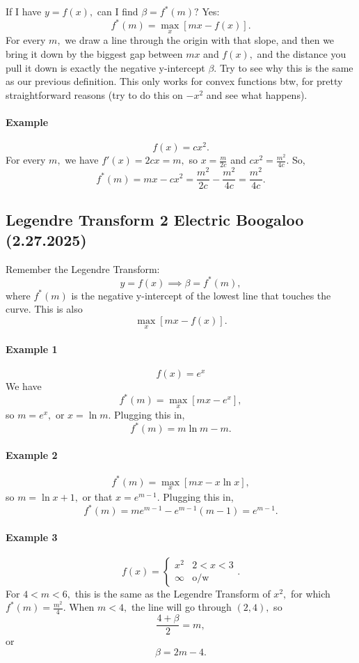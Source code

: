 \documentclass[12pt]{article}
\theoremstyle{remark}
\begin{document}
If I have $y=f(x),$ can I find $\beta=f^\ast(m)?$ Yes:
\[f^\ast(m)=\max_{x}[mx-f(x)].\] For every $m,$ we draw a line through the origin with that slope, and then we bring it down by the biggest gap between $mx$ and $f(x),$ and the distance you pull it down is exactly the negative y-intercept $\beta.$ Try to see why this is the same as our previous definition. This only works for convex functions btw, for pretty straightforward reasons (try to do this on $-x^2$ and see what happens).

\paragraph{Example}
\[f(x)=cx^2.\]
For every $m,$ we have $f'(x)=2cx=m,$ so $x=\frac{m}{2c}$ and $cx^2=\frac{m^2}{4c}.$
So,
\[f^\ast(m)=mx-cx^2=\frac{m^2}{2c}-\frac{m^2}{4c}=\frac{m^2}{4c}.\]

\subsection{Legendre Transform 2 Electric Boogaloo (2.27.2025)}
Remember the Legendre Transform:
\[y=f(x)\implies \beta=f^\ast(m),\]
where $f^\ast(m)$ is the negative y-intercept of the lowest line that touches the curve. This is also
\[\max_x[mx-f(x)].\]
\paragraph{Example 1}
\[f(x)=e^x\]
We have
\[f^\ast(m)=\max_x[mx-e^x],\] so $m=e^x,$ or $x=\ln m.$ Plugging this in,
\[f^\ast(m)=m\ln m-m.\]

\paragraph{Example 2}
\[f^\ast(m)=\max_x[mx-x\ln x],\] so $m=\ln x + 1,$ or that $x=e^{m-1}.$ Plugging this in,
\[f^\ast(m)=me^{m-1}-e^{m-1}(m-1)=e^{m-1}.\]
\paragraph{Example 3}
\[f(x)=\begin{cases}
    x^2&2<x<3\\
    \infty &\text{o/w}
\end{cases}.\]
For $4<m<6,$ this is the same as the Legendre Transform of $x^2,$ for which $f^\ast(m)=\frac{m^2}{4}.$ When $m<4,$ the line will go through $(2,4),$ so
\[\frac{4+\beta}{2}=m,\] or
\[\beta=2m-4.\]
\end{document}
